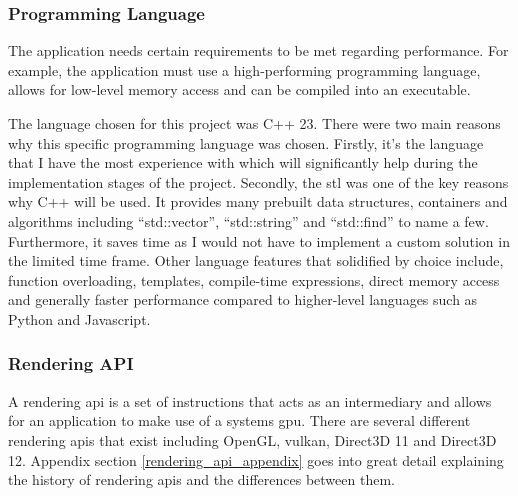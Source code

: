 \documentclass[11pt]{article}
\begin{document}


\subsubsection{Programming Language}
The application needs certain requirements to be met regarding performance. For
example, the application must use a high-performing programming language, allows
for low-level memory access and can be compiled into an executable.

The language chosen for this project was C++ 23.  There were two main reasons
why this specific programming language was chosen. Firstly, it's the language
that I have the most experience with which will significantly help during the
implementation stages of the project. Secondly, the \gls*{stl}  was one of the
key reasons why C++ will be used. It provides many prebuilt data structures,
containers and algorithms including ``std::vector'', ``std::string'' and
``std::find'' to name a few. Furthermore, it saves time as I would not have to
implement a custom solution in the limited time frame. Other language features
that solidified by choice include, function overloading, templates, compile-time
expressions, direct memory access and generally faster performance compared to
higher-level languages such as Python and Javascript.

\subsubsection{Rendering API} \label{rendering_api}
A rendering \gls*{api} is a set of instructions that acts as an intermediary and
allows for an application to make use of a systems \gls*{gpu}. There are several
different rendering \glspl*{api} that exist including OpenGL, \gls*{vulkan},
Direct3D 11 and Direct3D 12. Appendix section \ref{rendering_api_appendix} goes
into great detail explaining the history of rendering \glspl*{api} and the
differences between them.
\end{document}
